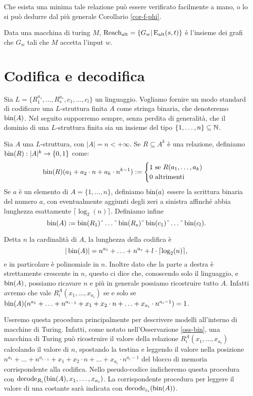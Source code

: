Che esista una minima tale relazione può essere verificato facilmente a mano, o
lo si può dedurre dal più generale Corollario \ref{cor-f-phi}.
\begin{definizione}
\label{def:Ralt}
 Data una macchina di turing $M$, $\operatorname{Reach_{alt}} = \{G_w | \operatorname{E_{alt}}(s,t) \}$ è l'insieme
 dei grafi che $G_w$ tali che $M$ accetta l'input $w$.
\end{definizione}


\section{Codifica e decodifica}
Sia $L=\{R^{a_1}_1, \ldots, R^{a_s}_s, c_1, \ldots, c_l\}$ un linguaggio.
Vogliamo fornire un modo standard di codificare una $L$-struttura finita $A$ come
stringa binaria, che denoteremo $\operatorname{bin}(A)$. Nel seguito supporremo sempre, senza
perdita di generalità, che
il dominio di una $L$-struttura finita sia un insieme del tipo
$\{1,\ldots,n\} \subseteq \mathbb{N}$.

\begin{definizione}
  Sia $A$ una $L$-struttura, con $|A| = n < +\infty$.
  Se $R \subseteq A^k$ è una relazione,
  definiamo $\operatorname{bin}(R): |A|^k \to \{0,1\}$ come:
  \[\operatorname{bin}(R)(a_1 + a_2 \cdot n + a_k \cdot n^{k-1}):=
    \begin{cases}
      1 \mbox{ se } R(a_1,\ldots,a_k) \\
      0 \mbox{ altrimenti}
    \end{cases}
  \]
  Se $a$ è un elemento di $A=\{1,\ldots,n\}$, definiamo $\operatorname{bin}(a)$ essere la
  scrittura binaria del numero $a$, con eventualmente aggiunti degli zeri a
  sinistra affinché abbia lunghezza esattamente $\lceil \log_2(n) \rceil$.
  Definiamo infine
  \[\bin(A):=\bin(R_1)\string^\ldots\string^\bin(R_s)\string^\bin(c_1)\string^\ldots\string^\bin(c_l).\]
\end{definizione}

\begin{osservazione}
\label{oss-bin}
 Detta $n$ la cardinalità di $A$, la lunghezza della codifica è
 \[ |\operatorname{bin}(A)|=n^{a_1} + \ldots + n^{a_s} + l \cdot \lceil \log_2(n) \rceil, \]
 e in particolare è polinomiale in $n$. Inoltre dato che la parte a destra è
 strettamente crescente in $n$, questo ci dice che, conoscendo solo il linguaggio,
 e $\operatorname{bin}(A)$, possiamo ricavare $n$ e più in generale possiamo ricostruire tutto $A$.
 Infatti avremo che vale $R_i^A(x_1,\ldots, x_{a_i})$ se e solo se
 $\operatorname{bin}(A)(n^{a_1} + \ldots + n^{a_{i-1}} + x_1 + x_2 \cdot n + \ldots + x_{a_i} \cdot n^{a_i-1}) = 1$.
\end{osservazione}
Useremo questa procedura principalmente per descrivere modelli all'interno
di macchine di Turing. Infatti, come notato nell'Osservazione \ref{oss-bin},
una macchina di Turing può ricostruire
il valore della relazione $R_i^A(x_1, \ldots, x_{a_i})$ calcolando il valore
di $n$, spostando la testina e leggendo il valore nella posizione
$n^{a_1} + \ldots + n^{a_{i-1}} + x_1 + x_2 \cdot n + \ldots + x_{a_i} \cdot n^{a_i-1}$
del blocco di memoria corrispondente alla codifica.
Nello pseudo-codice indicheremo questa procedura con
$\operatorname{decode}_{R_i}(\operatorname{bin}(A), x_1, \ldots, x_{a_i})$. La corrispondente procedura per
leggere il valore di una costante sarà indicata con $\operatorname{decode}_{c_i} (\operatorname{bin}(A))$.

